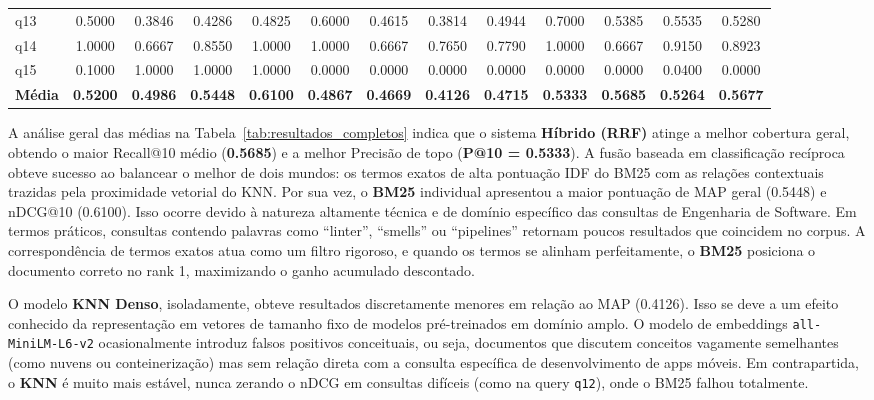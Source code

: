 \documentclass[12pt]{article}
\begin{document}
\begin{table}[htbp]
{\begin{tabular}{lcccccccccccc}
q13 & 0.5000 & 0.3846 & 0.4286 & 0.4825 & 0.6000 & 0.4615 & 0.3814 & 0.4944 & 0.7000 & 0.5385 & 0.5535 & 0.5280 \\
q14 & 1.0000 & 0.6667 & 0.8550 & 1.0000 & 1.0000 & 0.6667 & 0.7650 & 0.7790 & 1.0000 & 0.6667 & 0.9150 & 0.8923 \\
q15 & 0.1000 & 1.0000 & 1.0000 & 1.0000 & 0.0000 & 0.0000 & 0.0000 & 0.0000 & 0.0000 & 0.0000 & 0.0400 & 0.0000 \\ \midrule
\textbf{Média} & \textbf{0.5200} & \textbf{0.4986} & \textbf{0.5448} & \textbf{0.6100} & \textbf{0.4867} & \textbf{0.4669} & \textbf{0.4126} & \textbf{0.4715} & \textbf{0.5333} & \textbf{0.5685} & \textbf{0.5264} & \textbf{0.5677} \\ \bottomrule
\end{tabular}
}
\end{table}

A análise geral das médias na Tabela~\ref{tab:resultados_completos} indica que o sistema \textbf{Híbrido (RRF)} atinge a melhor cobertura geral, obtendo o maior Recall@10 médio (\textbf{0.5685}) e a melhor Precisão de topo (\textbf{P@10 = 0.5333}). A fusão baseada em classificação recíproca obteve sucesso ao balancear o melhor de dois mundos: os termos exatos de alta pontuação IDF do BM25 com as relações contextuais trazidas pela proximidade vetorial do KNN.
Por sua vez, o \textbf{BM25} individual apresentou a maior pontuação de MAP geral (0.5448) e nDCG@10 (0.6100). Isso ocorre devido à natureza altamente técnica e de domínio específico das consultas de Engenharia de Software. Em termos práticos, consultas contendo palavras como ``linter'', ``smells'' ou ``pipelines'' retornam poucos resultados que coincidem no corpus. A correspondência de termos exatos atua como um filtro rigoroso, e quando os termos se alinham perfeitamente, o \textbf{BM25} posiciona o documento correto no rank 1, maximizando o ganho acumulado descontado.

O modelo \textbf{KNN Denso}, isoladamente, obteve resultados discretamente menores em relação ao MAP (0.4126). Isso se deve a um efeito conhecido da representação em vetores de tamanho fixo de modelos pré-treinados em domínio amplo. O modelo de embeddings \texttt{all-MiniLM-L6-v2} ocasionalmente introduz falsos positivos conceituais, ou seja, documentos que discutem conceitos vagamente semelhantes (como nuvens ou conteinerização) mas sem relação direta com a consulta específica de desenvolvimento de apps móveis. Em contrapartida, o \textbf{KNN} é muito mais estável, nunca zerando o nDCG em consultas difíceis (como na query \texttt{q12}), onde o BM25 falhou totalmente.
\end{document}

